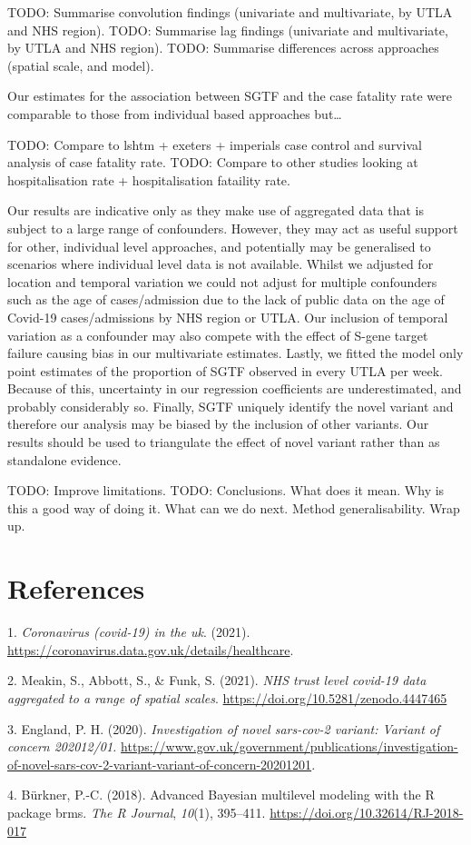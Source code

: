 \documentclass[
]{article}
\begin{document}
TODO: Summarise convolution findings (univariate and multivariate, by
UTLA and NHS region). TODO: Summarise lag findings (univariate and
multivariate, by UTLA and NHS region). TODO: Summarise differences
across approaches (spatial scale, and model).

Our estimates for the association between SGTF and the case fatality
rate were comparable to those from individual based approaches
but\ldots{}

TODO: Compare to lshtm + exeters + imperials case control and survival
analysis of case fatality rate. TODO: Compare to other studies looking
at hospitalisation rate + hospitalisation fataility rate.

Our results are indicative only as they make use of aggregated data that
is subject to a large range of confounders. However, they may act as
useful support for other, individual level approaches, and potentially
may be generalised to scenarios where individual level data is not
available. Whilst we adjusted for location and temporal variation we
could not adjust for multiple confounders such as the age of
cases/admission due to the lack of public data on the age of Covid-19
cases/admissions by NHS region or UTLA. Our inclusion of temporal
variation as a confounder may also compete with the effect of S-gene
target failure causing bias in our multivariate estimates. Lastly, we
fitted the model only point estimates of the proportion of SGTF observed
in every UTLA per week. Because of this, uncertainty in our regression
coefficients are underestimated, and probably considerably so. Finally,
SGTF uniquely identify the novel variant and therefore our analysis may
be biased by the inclusion of other variants. Our results should be used
to triangulate the effect of novel variant rather than as standalone
evidence.

TODO: Improve limitations. TODO: Conclusions. What does it mean. Why is
this a good way of doing it. What can we do next. Method
generalisability. Wrap up.

\hypertarget{references}{%
\section{References}\label{references}}

\hypertarget{refs}{}
\leavevmode\hypertarget{ref-ukgov}{}%
1. \emph{Coronavirus (covid-19) in the uk}. (2021).
\url{https://coronavirus.data.gov.uk/details/healthcare}.

\leavevmode\hypertarget{ref-covidnhsdata}{}%
2. Meakin, S., Abbott, S., \& Funk, S. (2021). \emph{NHS trust level
covid-19 data aggregated to a range of spatial scales}.
\url{https://doi.org/10.5281/zenodo.4447465}

\leavevmode\hypertarget{ref-phe}{}%
3. England, P. H. (2020). \emph{Investigation of novel sars-cov-2
variant: Variant of concern 202012/01.}
\url{https://www.gov.uk/government/publications/investigation-of-novel-sars-cov-2-variant-variant-of-concern-20201201}.

\leavevmode\hypertarget{ref-brms}{}%
4. Bürkner, P.-C. (2018). Advanced Bayesian multilevel modeling with the
R package brms. \emph{The R Journal}, \emph{10}(1), 395--411.
\url{https://doi.org/10.32614/RJ-2018-017}
\end{document}
